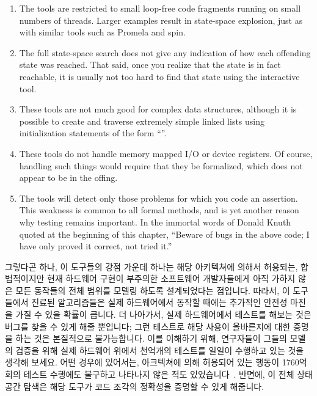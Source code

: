 \begin{enumerate}
\item	The tools are restricted to small loop-free code fragments
	running on small numbers of threads. Larger examples result
	in state-space explosion, just as with similar tools such as
	Promela and spin.
\item	The full state-space search does not give any indication of how
	each offending state was reached. That said, once you realize
	that the state is in fact reachable, it is usually not too hard
	to find that state using the interactive tool.
\item	These tools are not much good for complex data structures, although
	it is possible to create and traverse extremely simple linked
	lists using initialization statements of the form
	``''.
\item	These tools do not handle memory mapped I/O or device registers.
	Of course, handling such things would require that they be
	formalized, which does not appear to be in the offing.
\item	The tools will detect only those problems for which you code an
	assertion. This weakness is common to all formal methods, and
	is yet another reason why testing remains important. In the
	immortal words of Donald Knuth quoted at the beginning of this
	chapter, ``Beware of bugs in the above
	code; I have only proved it correct, not tried it.''
\fi
\end{enumerate}

그렇다곤 하나, 이 도구들의 강점 가운데 하나는 해당 아키텍쳐에 의해서 허용되는,
합법적이지만 현재 하드웨어 구현이 부주의한 소프트웨어 개발자들에게 아직 가하지
않은 모든 동작들의 전체 범위를 모델링 하도록 설계되었다는 점입니다.
따라서, 이 도구들에서 진료된 알고리즘들은 실제 하드웨어에서 동작할 때에는
추가적인 안전성 마진을 가질 수 있을 확률이 큽니다.
더 나아가서, 실제 하드웨어에서 테스트를 해보는 것은 버그를 찾을 수 있게 해줄
뿐입니다; 그런 테스트로 해당 사용이 올바른지에 대한 증명을 하는 것은 본질적으로
불가능합니다.
이를 이해하기 위해, 연구자들이 그들의 모델의 검증을 위해 실제 하드웨어 위에서
천억개의 테스트를 일일이 수행하고 있는 것을 생각해 보세요.
어떤 경우에 있어서는, 아크텍쳐에 의해 허용되어 있는 행동이 1760억 회의 테스트
수행에도 불구하고 나타나지 않은 적도 있었습니다~\cite{JadeAlglave2011ppcmem}.
반면에, 이 전체 상태 공간 탐색은 해당 도구가 코드 조각의 정확성을 증명할 수
있게 해줍니다.
\iffalse


